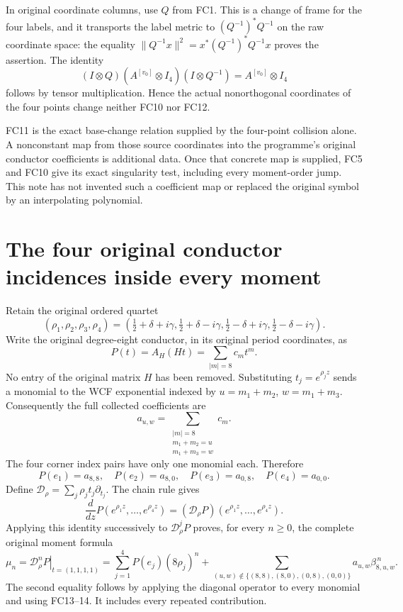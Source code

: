 \documentclass[11pt]{article}
\begin{document}
In original coordinate columns, use $Q$ from FC1. This is a change of
frame for the four labels, and it transports the label metric to
$(Q^{-1})^*Q^{-1}$ on the raw coordinate space: the equality
$\|Q^{-1}x\|^2=x^*(Q^{-1})^*Q^{-1}x$ proves the assertion. The
identity
\[
 (I\otimes Q)(A^{[v_0]}\otimes I_4)(I\otimes Q^{-1})
 =A^{[v_0]}\otimes I_4
\]
follows by tensor multiplication. Hence the actual nonorthogonal
coordinates of the four points change neither FC10 nor FC12.

FC11 is the exact base-change relation supplied by the four-point
collision alone. A nonconstant map from those source coordinates into
the programme's original conductor coefficients is additional data.
Once that concrete map is supplied, FC5 and FC10 give its exact
singularity test, including every moment-order jump. This note has not
invented such a coefficient map or replaced the original symbol by an
interpolating polynomial.

\section{The four original conductor incidences inside every moment}
Retain the original ordered quartet
\[
 (\rho_1,\rho_2,\rho_3,\rho_4)
 =(\tfrac12+\delta+i\gamma,\tfrac12+\delta-i\gamma,
 \tfrac12-\delta+i\gamma,\tfrac12-\delta-i\gamma).
\]
Write the original degree-eight conductor, in its original period
coordinates, as
\[
 P(t)=A_H(Ht)=\sum_{|m|=8}c_m t^m.
\]
No entry of the original matrix $H$ has been removed. Substituting
$t_j=e^{\rho_jz}$ sends a monomial to the WCF exponential indexed by
$u=m_1+m_2$, $w=m_1+m_3$. Consequently the full collected coefficients
are
\begin{equation}
 a_{u,w}=\sum_{\substack{|m|=8\\m_1+m_2=u\\m_1+m_3=w}}c_m.
 \tag{FC13}
\end{equation}
The four corner index pairs have only one monomial each. Therefore
\begin{equation}
 P(e_1)=a_{8,8},\quad P(e_2)=a_{8,0},\quad
 P(e_3)=a_{0,8},\quad P(e_4)=a_{0,0}.\tag{FC14}
\end{equation}
Define $\mathcal D_\rho=\sum_j\rho_jt_j\partial_{t_j}$.
The chain rule gives
\[
 \frac{d}{dz}P(e^{\rho_1z},\ldots,e^{\rho_4z})
 =(\mathcal D_\rho P)(e^{\rho_1z},\ldots,e^{\rho_4z}).
\]
Applying this identity successively to $\mathcal D_\rho^jP$ proves,
for every $n\ge0$, the complete original moment formula
\begin{equation}
 \mu_n=\left.\mathcal D_\rho^nP\right|_{t=(1,1,1,1)}
 =\sum_{j=1}^4 P(e_j)(8\rho_j)^n
 +\sum_{(u,w)\notin\{(8,8),(8,0),(0,8),(0,0)\}}
     a_{u,w}\beta_{8,u,w}^{\,n}.\tag{FC15}
\end{equation}
The second equality follows by applying the diagonal operator to every
monomial and using FC13--14. It includes every repeated contribution.
\end{document}
